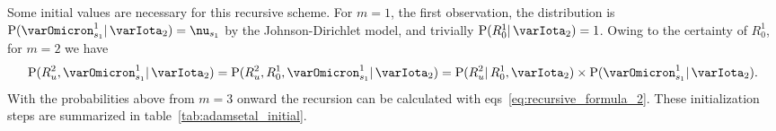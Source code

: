 \documentclass[\ifafour a4paper,12pt,\else a5paper,10pt,\fi%
onecolumn,oneside,article,%
british%
]{memoir}
\theoremstyle{remark}
\theoremstyle{innote}
\newcommand*{\p}{\mathrm{P}}%
\renewcommand*{\|}{\mathpunct{|}}
\newcommand*{\eqns}{eqs}%
\newcommand*{\yI}{\varIota}
\newcommand*{\yO}{\varOmicron}
\newcommand*{\yMc}{\yI_2}
\newcommand*{\ynn}{\nu}
\begin{document}
\bigskip

Some initial values are necessary for this recursive scheme. For $m=1$, the
first observation, the distribution is $\p(\yO^{1}_{s_1} \| \yMc)=\ynn_{s_1}$
by the Johnson-Dirichlet model, and trivially $\p(R^{1}_{0} \| \yMc)=1$.
Owing to the certainty of $R^1_0$, for $m=2$ we have
\begin{equation}
  \label{eq:initial_R2}
  \p(R^{2}_{u}, \yO^{1}_{s_{1}} \|  \yMc)
  = \p(R^{2}_{u},R^{1}_{0}, \yO^{1}_{s_{1}} \|  \yMc)
  = \p(R^{2}_{u} \| R^{1}_{0},  \yMc) \times
  \p( \yO^{1}_{s_{1}} \|  \yMc).
\end{equation}
With the probabilities above from $m=3$ onward the recursion can be
calculated with \eqns~\eqref{eq:recursive_formula_2}. These initialization
steps are summarized in table~\ref{tab:adamsetal_initial}.
\end{document}
